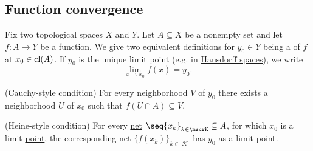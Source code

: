 \subsection{Function convergence}\label{subsec:function_convergence}

\begin{definition}\label{def:local_convergence}
  Fix two topological spaces \( X \) and \( Y \). Let \( A \subseteq X \) be a nonempty set and let \( f: A \to Y \) be a function. We give two equivalent definitions for \( y_0 \in Y \) being a  of \( f \) at \( x_0 \in \operatorname{cl}(A) \). If \( y_0 \) is the unique limit point (e.g. in \hyperref[def:separation_axioms/T2]{Hausdorff spaces}), we write
  \begin{equation*}
    \lim_{x \to x_0} f(x) = y_0.
  \end{equation*}

  \begin{thmenum}
    (Cauchy-style condition) For every neighborhood \( V \) of \( y_0 \) there exists a neighborhood \( U \) of \( x_0 \) such that \( f(U \cap A) \subseteq V \).

    (Heine-style condition) For every \hyperref[def:topological_net]{net} \( \seq{ x_k }_{k \in \mscrK} \subseteq A \), for which \( x_0 \) is a limit \hyperref[def:net_limit_point]{point}, the corresponding net \( \{ f(x_k) \}_{k \in \mscrK} \) has \( y_0 \) as a limit point.
  \end{thmenum}
\end{definition}
